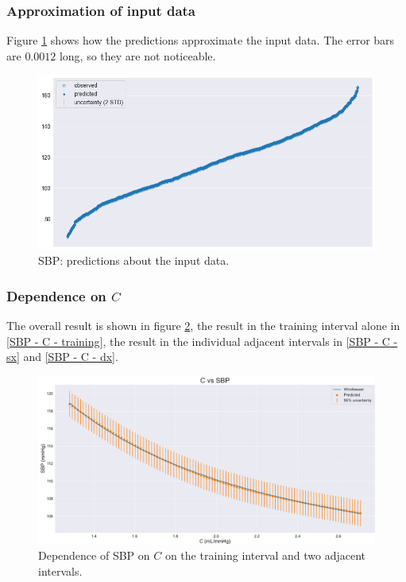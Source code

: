 \vspace{-0.5cm}

\subsubsection{Approximation of input data}
Figure \ref{SBP - inference} shows how the predictions approximate the input data. The error bars are $0.0012$ long, so they are not noticeable.

\begin{figure}[h]
    \centering
    \includegraphics[width=1\textwidth]{images/Training (risultati)/SBP/SBP - inference.png}
    \caption{SBP: predictions about the input data.}
    \label{SBP - inference}
\end{figure}



\subsubsection{Dependence on $C$}
The overall result is shown in figure \ref{SBP - C - full}, the result in the training interval alone in \ref{SBP - C - training}, the result in the individual adjacent intervals in \ref{SBP - C - sx} and \ref{SBP - C - dx}.

\vspace{1cm}

\begin{figure}[!htb]
    \centering
    \includegraphics[width=1\textwidth]{images/Training (risultati)/SBP/SBP - C - full.pdf}
    \caption{Dependence of SBP on $C$ on the training interval and two adjacent intervals.}
    \label{SBP - C - full}
\end{figure}

